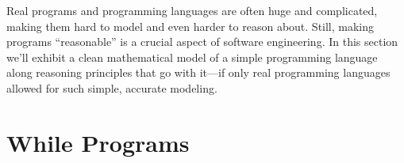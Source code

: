 \label{while_chap}

\iffalse
\def\movesto{\mathrel{\longrightarrow}}
\newcommand{\while}{\text{\textbf{while}}}
\newcommand{\docomm}{\text{\textbf{do}}}
\newcommand{\odcomm}{\text{\textbf{od}}}
\newcommand{\wloop}[2]{\while\ #1\ \docomm\ #2\ \odcomm}
\newcommand{\assigned}{\mathbin{\mathtt{:=}}}
\newcommand{\condif}{\text{\textbf{if}}}
\newcommand{\condthen}{\text{\textbf{then}}}
\newcommand{\condelse}{\text{\textbf{else}}}
\newcommand{\condcomm}[3]{\condif\ #1\ \condthen\ #2\ \condelse\ #3}
\newcommand{\seqcomm}[2]{#1\mathbf{;}#2}
\newcommand{\Env}{\text{Env}}
\newcommand{\halt}{\text{\textbf{Done}}}
\newcommand{\state}[2]{\ang{#1,\, #2}}
\newcommand{\step}[4]{\state{#1}{#2} \movesto \state{#3}{#4}}
\newcommand{\haltswith}[3]{\state{#1}{#2}\movesto^* \state{\halt}{#3}}
\newcommand{\after}[3]{#1 \: \set{#2}\: #3}
\fi

Real programs and programming languages are often huge and
complicated, making them hard to model and even harder to reason
about.  Still, making programs ``reasonable'' is a crucial aspect of
software engineering.  In this section we'll exhibit a clean
mathematical model of a simple programming language along reasoning
principles that go with it---if only real programming languages
allowed for such simple, accurate modeling.

\section{\textbf{While} Programs}

